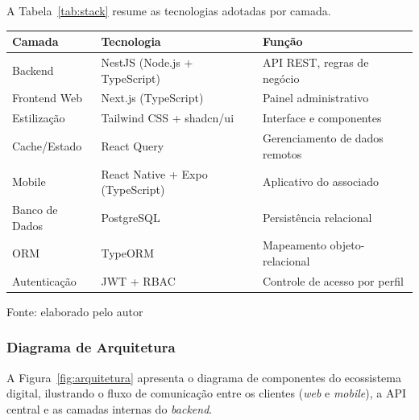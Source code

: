 ﻿\documentclass[12pt,a4paper]{article}
\newcommand{\fonte}[1]{\par\vspace{2pt}\footnotesize{Fonte: #1}}
\begin{document}
A Tabela~\ref{tab:stack} resume as tecnologias adotadas por camada.

\begin{center}
\label{tab:stack}
\begin{tabular}{lll}
\hline
\textbf{Camada} & \textbf{Tecnologia} & \textbf{Função} \\
\hline
Backend & NestJS (Node.js + TypeScript) & API REST, regras de negócio \\
Frontend Web & Next.js (TypeScript) & Painel administrativo \\
Estilização & Tailwind CSS + shadcn/ui & Interface e componentes \\
Cache/Estado & React Query & Gerenciamento de dados remotos \\
Mobile & React Native + Expo (TypeScript) & Aplicativo do associado \\
Banco de Dados & PostgreSQL & Persistência relacional \\
ORM & TypeORM & Mapeamento objeto-relacional \\
Autenticação & JWT + RBAC & Controle de acesso por perfil \\
\hline
\end{tabular}
\fonte{elaborado pelo autor}
\end{center}

\subsubsection{Diagrama de Arquitetura}

A Figura~\ref{fig:arquitetura} apresenta o diagrama de componentes do ecossistema digital, ilustrando o fluxo de comunicação entre os clientes (\textit{web} e \textit{mobile}), a API central e as camadas internas do \textit{backend}.
\end{document}
